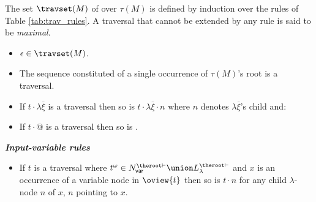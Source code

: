 \begin{definition} \rm
\label{def:traversal} The set $\travset(M)$ of 
over $\tau(M)$ is defined by induction over the rules of Table
\ref{tab:trav_rules}. A traversal that cannot be extended by any
rule is said to be \emph{maximal}.
\end{definition}

\begin{FramedTable}
\begin{itemize}[]
\item{} $\epsilon \in \travset(M)$.
\item{} The sequence constituted of a single occurrence of $\tau(M)$'s root is a traversal.
\end{itemize}

\begin{itemize}[]
    \item {} If $t \cdot \lambda \overline{\xi}$ is a traversal then so is
        $t \cdot \lambda \overline{\xi} \cdot n$ where $n$
        denotes $\lambda \overline{\xi}$'s child and:
    \item {} If $t \cdot @$ is a traversal then so is .
\end{itemize}

\emph{\bf Input-variable rules}
\begin{itemize}[]
\item {} If $t$ is a traversal where $t^\omega \in N_{\sf var}^{\theroot\vdash} \union L_\lambda^{\theroot\vdash}$
and $x$ is an occurrence of a variable node in $\oview{t}$ then
so is $t \cdot n$ for any child $\lambda$-node $n$ of $x$, $n$
pointing to $x$.




\end{itemize}
\end{FramedTable}
